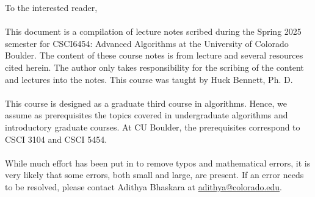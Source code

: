 To the interested reader,
\\
\\
This document is a compilation of lecture notes scribed during the Spring 2025 semester for CSCI6454: Advanced Algorithms at the University of Colorado Boulder. The content of these course notes is from lecture and several resources cited herein. The author only takes responsibility for the scribing of the content and lectures into the notes. This course was taught by Huck Bennett, Ph. D.
\\
\\
This course is designed as a graduate third course in algorithms. Hence, we assume as prerequisites the topics covered in undergraduate algorithms and introductory graduate courses. At CU Boulder, the prerequisites correspond to CSCI 3104 and CSCI 5454.
\\
\\
While much effort has been put in to remove typos and mathematical errors, it is very likely that some errors, both small and large, are present. If an error needs to be resolved, please contact Adithya Bhaskara at \href{mailto:adithya@colorado.edu}{adithya@colorado.edu}.
\\
\\
\vfill
{}